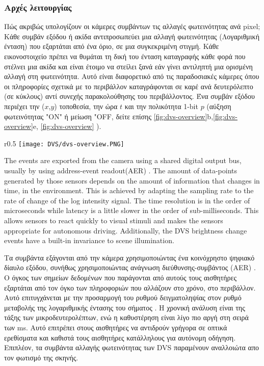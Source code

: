 \documentclass[12pt]{report}
\begin{document}
\subsubsection{Αρχές λειτουργίας}
Πώς ακριβώς υπολογίζουν οι κάμερες συμβάντων τις αλλαγές φωτεινότητας ανά \textlatin{ pixel}; Κάθε συμβάν εξόδου ή ακίδα αντιπροσωπεύει μια αλλαγή φωτεινότητας (Λογαριθμική ένταση) που εξαρτάται από ένα όριο, σε μια συγκεκριμένη στιγμή. Κάθε εικονοστοιχείο πρέπει να θυμάται τη δική του ένταση καταγραφής κάθε φορά που στέλνει μια ακίδα και είναι έτοιμο να στείλει ξανά εάν γίνει αντιληπτή μια ορισμένη αλλαγή στη φωτεινότητα. Αυτό είναι διαφορετικό από τις παραδοσιακές κάμερες όπου οι πληροφορίες σχετικά με το περιβάλλον καταγράφονται σε καρέ ανά δευτερόλεπτο (σε κύκλους) αντί συνεχής παρακολούθησης του περιβάλλοντος. Ένα συμβάν εξόδου περιέχει την ($x$,$y$) τοποθεσία, την ώρα $t$ και την πολικότητα 1-\textlatin{bit} $p$ (αύξηση φωτεινότητας "ON" ή μείωση "\textlatin{OFF}, δείτε επίσης \ref{fig:dvs-overview}b,\ref{fig:dvs-overview}e, \ref{fig:dvs-overview} \cite{davis}).

\begin{wrapfigure}{r}{0.5\textwidth} %
    \centering
     \texttt{[image: DVS/dvs-overview.PNG]}
    \caption{\textlatin{DAVIS}}
    \label{fig:dvs-overview}
\end{wrapfigure}

The events are exported from the camera using a shared digital output bus, usually by using address-event readout(AER) \cite{boahen2004} \cite{liu2015} . The amount of data-points generated by those sensors depends on the amount of information that changes in time, in the environment. This is achieved by adapting the sampling rate to the rate of change of the log intensity signal. The time resolution is in the order of microseconds while latency is a little slower in the order of sub-milliseconds. This allows sensors to react quickly to visual stimuli and makes the sensors appropriate for autonomous driving. Additionally, the DVS brightness change events have a built-in invariance to scene illumination.

Τα συμβάντα εξάγονται από την κάμερα χρησιμοποιώντας ένα κοινόχρηστο ψηφιακό δίαυλο εξόδου, συνήθως χρησιμοποιώντας ανάγνωση διεύθυνσης-συμβάντος (\textlatin{AER}) \cite{boahen2004} \cite{liu2015}. Ο όγκος των σημείων δεδομένων που παράγονται από αυτούς τους αισθητήρες εξαρτάται από τον όγκο των πληροφοριών που αλλάζουν στο χρόνο, στο περιβάλλον. Αυτό επιτυγχάνεται με την προσαρμογή του ρυθμού δειγματοληψίας στον ρυθμό μεταβολής της λογαριθμικής έντασης του σήματος . Η χρονική ανάλυση είναι της τάξης των μικροδευτερολέπτων, ενώ η καθυστέρηση είναι λίγο πιο αργή στη σειρά των \textlatin{ms}. Αυτό επιτρέπει στους αισθητήρες να αντιδρούν γρήγορα σε οπτικά ερεθίσματα και καθιστά τους αισθητήρες κατάλληλους για αυτόνομη οδήγηση. Επιπλέον, τα συμβάντα αλλαγής φωτεινότητας των \textlatin{DVS} παραμένουν αναλλοιώτα απο τον φωτισμό της σκηνής.
\end{document}
